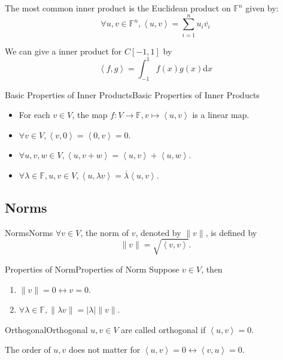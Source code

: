 \documentclass[../main.tex]{subfiles}
\begin{document}
The most common inner product is the Euclidean product on $\mathbb{F}^n$ given by:
\begin{equation*}
\forall u,v\in \mathbb{F}^n, \left<u,v\right> = \sum_{i=1}^{n} u_i \overline{ v_i}
\end{equation*}

We can give a inner product for $C[-1,1]$ by
\begin{equation*}
\left<f,g\right> = \int_{-1}^1 f(x)g(x) \mathrm{d}x
\end{equation*}

\begin{theorem}{Basic Properties of Inner Products}{Basic Properties of Inner Products}
\begin{itemize}
\item For each $v\in V$, the map $f: V \rightarrow \mathbb{F}, v \mapsto \left<u,v\right>$ is a linear map.
\item $\forall v\in V, \left<v,0\right> = \left<0,v\right> = 0$.
\item $\forall u,v,w\in V, \left<u,v+w\right> = \left<u,v\right> + \left<u,w\right>$.
\item $\forall \lambda\in \mathbb{F},u,v\in V, \left<u,\lambda v\right>  = \overline{\lambda} \left<u,v\right>$.
\end{itemize}
\end{theorem}

\subsection{Norms}

\begin{definition}{Norms}{Norms}
$\forall v\in V$, the norm of $v$, denoted by $\|v\|$, is defined by
\begin{equation*}
\|v\| = \sqrt{\left<v,v\right>}.
\end{equation*}
\end{definition}

\begin{proposition}{Properties of Norm}{Properties of Norm}
Suppose $v\in V$, then 
\begin{enumerate}
	\item $\|v\| = 0 \leftrightarrow v=0$.
	\item $\forall \lambda\in \mathbb{F},\|\lambda v\| = \left|\lambda\right| \|v\|$.
\end{enumerate}
\end{proposition}

\begin{definition}{Orthogonal}{Orthogonal}
$u,v\in V$ are called orthogonal if $\left<u,v\right> =0$.
\end{definition}
The order of $u,v$ does not matter for $\left<u,v\right> = 0 \leftrightarrow \left<v,u\right> =0$.
\end{document}
